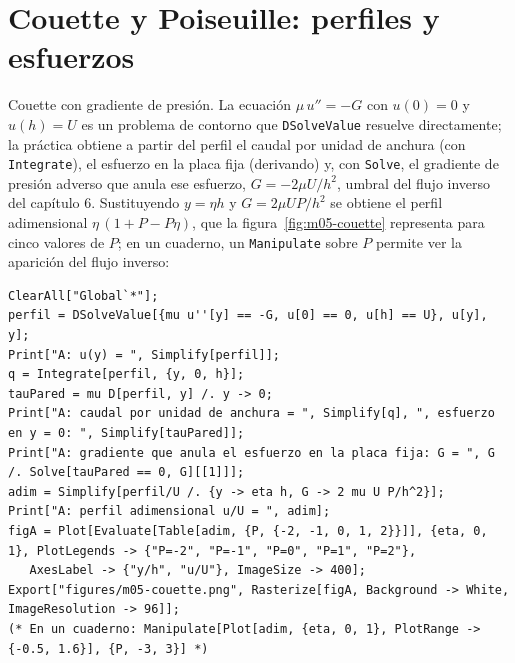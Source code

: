 \documentclass[10pt,openany]{book}
\begin{document}
\section{Couette y Poiseuille: perfiles y esfuerzos}

Couette con gradiente de presión. La ecuación \(\mu\,u'' = -G\) con \(u(0) = 0\) y \(u(h) = U\) es un problema de contorno que \texttt{DSolveValue} resuelve directamente; la práctica obtiene a partir del perfil el caudal por unidad de anchura (con \texttt{Integrate}), el esfuerzo en la placa fija (derivando) y, con \texttt{Solve}, el gradiente de presión adverso que anula ese esfuerzo, \(G = -2\mu U/h^{2}\), umbral del flujo inverso del capítulo 6. Sustituyendo \(y = \eta h\) y \(G = 2\mu U P/h^{2}\) se obtiene el perfil adimensional \(\eta\,(1 + P - P\eta)\), que la figura~\ref{fig:m05-couette} representa para cinco valores de \(P\); en un cuaderno, un \texttt{Manipulate} sobre \(P\) permite ver la aparición del flujo inverso:
\begin{lstlisting}[style=studium]
ClearAll["Global`*"];
perfil = DSolveValue[{mu u''[y] == -G, u[0] == 0, u[h] == U}, u[y], y];
Print["A: u(y) = ", Simplify[perfil]];
q = Integrate[perfil, {y, 0, h}];
tauPared = mu D[perfil, y] /. y -> 0;
Print["A: caudal por unidad de anchura = ", Simplify[q], ", esfuerzo en y = 0: ", Simplify[tauPared]];
Print["A: gradiente que anula el esfuerzo en la placa fija: G = ", G /. Solve[tauPared == 0, G][[1]]];
adim = Simplify[perfil/U /. {y -> eta h, G -> 2 mu U P/h^2}];
Print["A: perfil adimensional u/U = ", adim];
figA = Plot[Evaluate[Table[adim, {P, {-2, -1, 0, 1, 2}}]], {eta, 0, 1}, PlotLegends -> {"P=-2", "P=-1", "P=0", "P=1", "P=2"},
   AxesLabel -> {"y/h", "u/U"}, ImageSize -> 400];
Export["figures/m05-couette.png", Rasterize[figA, Background -> White, ImageResolution -> 96]];
(* En un cuaderno: Manipulate[Plot[adim, {eta, 0, 1}, PlotRange -> {-0.5, 1.6}], {P, -3, 3}] *)
\end{lstlisting}
\end{document}
